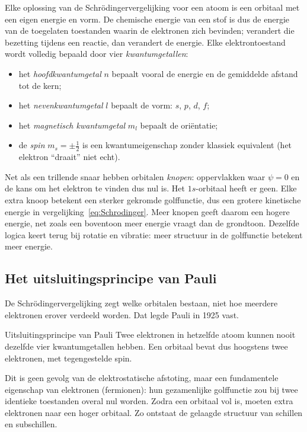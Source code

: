 Elke oplossing van de Schr\"odingervergelijking voor een atoom is een orbitaal met een eigen energie en vorm. De chemische energie van een stof is dus de energie van de toegelaten toestanden waarin de elektronen zich bevinden; verandert die bezetting tijdens een reactie, dan verandert de energie. Elke elektrontoestand wordt volledig bepaald door vier \emph{kwantumgetallen}:
\begin{itemize}
\item het \emph{hoofdkwantumgetal} $n$ bepaalt vooral de energie en de gemiddelde afstand tot de kern;
\item het \emph{nevenkwantumgetal} $l$ bepaalt de vorm: $s$, $p$, $d$, $f$;
\item het \emph{magnetisch kwantumgetal} $m_l$ bepaalt de oriëntatie;
\item de \emph{spin} $m_s = \pm\tfrac{1}{2}$ is een kwantumeigenschap zonder klassiek equivalent (het elektron ``draait'' niet echt).
\end{itemize}

Net als een trillende snaar hebben orbitalen \emph{knopen}: oppervlakken waar $\psi = 0$ en de kans om het elektron te vinden dus nul is. Het $1s$-orbitaal heeft er geen. Elke extra knoop betekent een sterker gekromde golffunctie, dus een grotere kinetische energie in vergelijking~\eqref{eq:Schrodinger}. Meer knopen geeft daarom een hogere energie, net zoals een boventoon meer energie vraagt dan de grondtoon. Dezelfde logica keert terug bij rotatie en vibratie: meer structuur in de golffunctie betekent meer energie.

\subsection{Het uitsluitingsprincipe van Pauli}

De Schr\"odingervergelijking zegt welke orbitalen bestaan, niet hoe meerdere elektronen erover verdeeld worden. Dat legde Pauli in 1925 vast.

\begin{definitie}{Uitsluitingsprincipe van Pauli}
Twee elektronen in hetzelfde atoom kunnen nooit dezelfde vier kwantumgetallen hebben. Een orbitaal bevat dus hoogstens twee elektronen, met tegengestelde spin.
\end{definitie}

Dit is geen gevolg van de elektrostatische afstoting, maar een fundamentele eigenschap van elektronen (fermionen): hun gezamenlijke golffunctie zou bij twee identieke toestanden overal nul worden. Zodra een orbitaal vol is, moeten extra elektronen naar een hoger orbitaal. Zo ontstaat de gelaagde structuur van schillen en subschillen.

